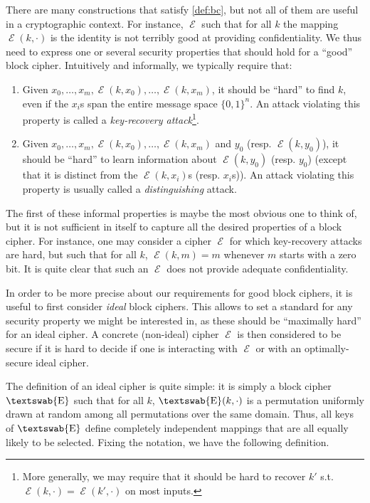 \documentclass[11pt,a4paper]{article}
\theoremstyle{definition}
\DeclareMathOperator\E{\mathcal{E}}
\DeclareMathOperator\iE{\textswab{E}}
\newcommand\msb{\{0,1\}^n}
\begin{document}
There are many constructions that satisfy \autoref{def:bc}, but not all of them are useful in a cryptographic context. For instance,
$\E$ such that for all $k$ the mapping $\E(k,\cdot)$ is the identity is not terribly good at providing confidentiality. We thus need to express one
or several security properties that should hold for a ``good'' block cipher. Intuitively and informally, we typically require that:
\begin{enumerate}
\item Given $x_0, \ldots, x_m, \E(k,x_0), \ldots, \E(k,x_m)$, it should be ``hard'' to find $k$, even if the $x_i$s span the entire
message space $\msb$. An attack violating this property is called a \emph{key-recovery attack}\footnote{More generally, we may
require that it should be hard to recover $k'$ s.t. $\E(k,\cdot) = \E(k',\cdot)$ on most inputs.}.
\item Given $x_0, \ldots, x_m, \E(k,x_0), \ldots, \E(k,x_m)$ and $y_0$ (resp. $\E(k,y_0)$), it should be ``hard'' to learn information about
$\E(k, y_0)$ (resp. $y_0$) (except that it is distinct from the $\E(k, x_i)$s (resp. $x_i$s)). An attack violating this property is usually called a \emph{distinguishing}
attack.
\end{enumerate}
The first of these informal properties is maybe the most obvious one to think of, but it is not sufficient in itself to capture all the
desired properties of a block cipher. For instance, one may consider a cipher $\E$ for which key-recovery attacks are hard, but such that for all
$k$, $\E(k,m) = m$ whenever $m$ starts with a zero bit. It is quite clear that such an $\E$ does not provide adequate confidentiality.

In order to be more precise about our requirements for
good block ciphers, it is useful to first consider \emph{ideal} block ciphers. This allows to set a standard for any
security property we might be interested in, as these should be ``maximally hard'' for an ideal cipher. A
concrete (non-ideal) cipher $\E$ is then considered to be secure if it is hard to decide if one is interacting
with $\E$ or with an optimally-secure ideal cipher.

The definition of an ideal cipher is quite simple: it is simply a block cipher $\iE$ such that for all $k$, $\iE(k,\cdot)$ is
a permutation uniformly drawn at random among all permutations over the same domain. Thus, all keys of $\iE$ define
completely independent mappings that are all equally likely to be selected. Fixing the notation, we have the following definition.
\end{document}
